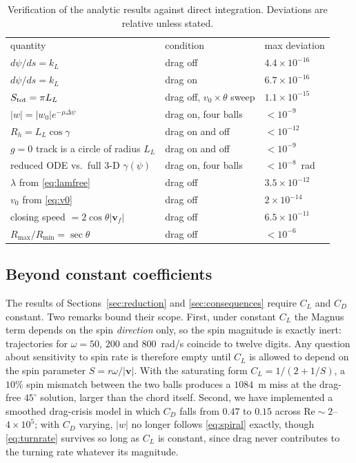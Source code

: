 \documentclass[aip,amsmath,amssymb,preprint,floatfix]{revtex4-2}
\newcommand{\kL}{k_{L}}
\newcommand{\LL}{L_{L}}
\newcommand{\vv}{\bm{v}}
\begin{document}
\begin{table}[t]
\caption{Verification of the analytic results against direct integration. Deviations
are relative unless stated.}
\label{tab:verify}
\begin{ruledtabular}
\begin{tabular}{lll}
quantity & condition & max deviation \\
\colrule
$d\psi/ds=\kL$                        & drag off & $4.4\times10^{-16}$ \\
$d\psi/ds=\kL$                        & drag on  & $6.7\times10^{-16}$ \\
$S_{\rm tot}=\pi\LL$                  & drag off, $v_0\times\theta$ sweep & $1.1\times10^{-15}$ \\
$|w|=|w_0|e^{-\mu\Delta\psi}$         & drag on, four balls & $<10^{-9}$ \\
$R_h=\LL\cos\gamma$                   & drag on and off & $<10^{-12}$ \\
$g=0$ track is a circle of radius $\LL$ & drag on and off & $<10^{-9}$ \\
reduced ODE vs.\ full 3-D $\gamma(\psi)$ & drag on, four balls & $<10^{-8}$~rad \\
$\lambda$ from \eqref{eq:lamfree}     & drag off & $3.5\times10^{-12}$ \\
$v_0$ from \eqref{eq:v0}              & drag off & $2\times10^{-14}$ \\
closing speed $=2\cos\theta|\vv_f|$   & drag off & $6.5\times10^{-11}$ \\
$R_{\max}/R_{\min}=\sec\theta$        & drag off & $<10^{-6}$ \\
\end{tabular}
\end{ruledtabular}
\end{table}

\subsection{Beyond constant coefficients}

The results of Sections~\ref{sec:reduction} and \ref{sec:consequences} require
$C_L$ and $C_D$ constant. Two remarks bound their scope. First, under constant $C_L$
the Magnus term depends on the spin \emph{direction} only, so the spin magnitude is
exactly inert: trajectories for $\omega=50$, $200$ and $800$~rad/s coincide to twelve
digits. Any question about sensitivity to spin rate is therefore empty until $C_L$ is
allowed to depend on the spin parameter $S=r\omega/|\vv|$. With the saturating form
$C_L=1/(2+1/S)$, a $10\%$ spin mismatch between the two balls produces a $1084$~m
miss at the drag-free $45^\circ$ solution, larger than the chord itself. Second, we
have implemented a smoothed drag-crisis model in which $C_D$ falls from $0.47$ to
$0.15$ across $\mathrm{Re}\sim2$--$4\times10^5$; with $C_D$ varying, $|w|$ no longer
follows \eqref{eq:spiral} exactly, though \eqref{eq:turnrate} survives so long as
$C_L$ is constant, since drag never contributes to the turning rate whatever its
magnitude.
\end{document}
